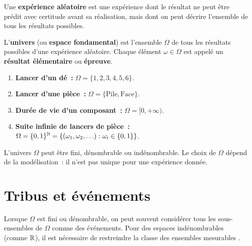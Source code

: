 \begin{definition}
Une \textbf{exp\'erience al\'eatoire} est une exp\'erience dont le r\'esultat ne peut
\^etre pr\'edit avec certitude avant sa r\'ealisation, mais dont on peut d\'ecrire
l'ensemble de tous les r\'esultats possibles.
\end{definition}

\begin{definition}[Univers]
L'\textbf{univers} (ou \textbf{espace fondamental}) est l'ensemble $\Omega$ de tous
les r\'esultats possibles d'une exp\'erience al\'eatoire. Chaque \'el\'ement
$\omega \in \Omega$ est appel\'e un \textbf{r\'esultat \'el\'ementaire} ou
\textbf{\'epreuve}.
\end{definition}

\begin{exemple}
\begin{enumerate}
    \item \textbf{Lancer d'un d\'e~:} $\Omega = \{1, 2, 3, 4, 5, 6\}$.
    \item \textbf{Lancer d'une pi\`ece~:} $\Omega = \{\text{Pile}, \text{Face}\}$.
    \item \textbf{Dur\'ee de vie d'un composant~:} $\Omega = [0, +\infty)$.
    \item \textbf{Suite infinie de lancers de pi\`ece~:}
          $\Omega = \{0, 1\}^{\mathbb{N}} = \{(\omega_1, \omega_2, \ldots) : \omega_i \in \{0,1\}\}$.
\end{enumerate}
\end{exemple}

\begin{remarque}
L'univers $\Omega$ peut \^etre fini, d\'enombrable ou ind\'enombrable. Le choix de
$\Omega$ d\'epend de la mod\'elisation~: il n'est pas unique pour une exp\'erience donn\'ee.
\end{remarque}

\section{Tribus et \'ev\'enements}

Lorsque $\Omega$ est fini ou d\'enombrable, on peut souvent consid\'erer tous les
sous-ensembles de $\Omega$ comme des \'ev\'enements. Pour des espaces ind\'enombrables
(comme $\mathbb{R}$), il est n\'ecessaire de restreindre la classe des ensembles
\og mesurables \fg.

